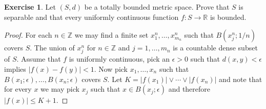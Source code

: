 \documentclass{amsbook}
\theoremstyle{definition}
\newtheorem{xca}{Exercise}
\theoremstyle{remark}
\newcommand{\reals}{\mathbb{R}}
\newcommand{\integers}{\mathbb{Z}}
\newcommand{\abs}[1]{\left \vert #1 \right \vert}
\begin{document}
\begin{xca}Let $(S,d)$ be a totally bounded metric space.  Prove that $S$ is separable and that every uniformly continuous function $f : S \to \reals$ is bounded.
\end{xca}
\begin{proof}For each $n \in \integers$ we may find a finite set $x^n_1, \dots, x^n_{m_n}$ such that $B(x^n_j; 1/n)$ covers $S$.  The union of $x^n_{j}$ for $n \in \integers$ and $j=1, \dotsc, m_n$ is a countable dense subset of $S$.  Assume that $f$ is uniformly continuous, pick an $\epsilon > 0$ such that $d(x,y) < \epsilon$ implies $\abs{f(x) - f(y)} < 1$.  Now pick $x_1, \dotsc, x_n$ such that $B(x_1; \epsilon), \dotsc, B(x_n; \epsilon)$ covers $S$.  Let $K = \abs{f(x_1)} \vee \dotsb \vee \abs{f(x_n)}$ and note that for every $x$ we may pick $x_j$ such that $x \in B(x_j; \epsilon)$ and therefore $\abs{f(x)} \leq K + 1$.
\end{proof}
\end{document}
